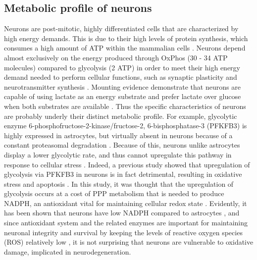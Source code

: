 \subsection{Metabolic profile of neurons}
Neurons are post-mitotic, highly differentiated cells that are characterized by high energy demands. This is due to their high levels of protein synthesis, which consumes a high amount of ATP within the mammalian cells \citep{Buttgereit1995}. Neurons depend almost exclusively on the energy produced through OxPhos (30 - 34 ATP molecules) compared to glycolysis (2 ATP) in order to meet their high energy demand needed to perform cellular functions, such as synaptic plasticity and neurotransmitter synthesis \citep{Cenini2019,Mattson2008,Schonfeld2013}. Mounting evidence demonstrate that neurons are capable of using lactate as an energy substrate \citep{Boumezbeur2010,Bouzier2000,Serres2005} and prefer lactate over glucose when both substrates are available \citep{Bouzier-Sore2006,Itoh2003}. Thus the specific characteristics of neurons are probably underly their distinct metabolic profile. For example, glycolytic enzyme 6-phosphofructose-2-kinase/fructose-2, 6-bisphosphatase-3 (PFKFB3) is highly expressed in astrocytes, but virtually absent in neurons because of a constant proteasomal degradation \citep{Almeida2004,Herrero-Mendez2009}. Because of this, neurons unlike astrocytes display a lower glycolytic rate, and thus cannot upregulate this pathway in response to cellular stress \citep{Almeida2004,Herrero-Mendez2009}. Indeed, a previous study showed that upregulation of glycolysis via PFKFB3 in neurons is in fact detrimental, resulting in oxidative stress and apoptosis \citep{Herrero-Mendez2009}. In this study, it was thought that the upregulation of glycolysis occurs at a cost of PPP metabolism that is needed to produce NADPH, an antioxidant vital for maintaining cellular redox state \citep{Herrero-Mendez2009}. Evidently, it has been shown that neurons have low NADPH compared to astrocytes \citep{Ben-Yoseph1996,Garcia-Nogales2003}, and since antioxidant system and the related enzymes are important for maintaining neuronal integrity and survival by keeping the levels of reactive oxygen species (ROS) relatively low \citep{Cenini2019}, it is not surprising that neurons are vulnerable to oxidative damage, implicated in neurodegeneration.

